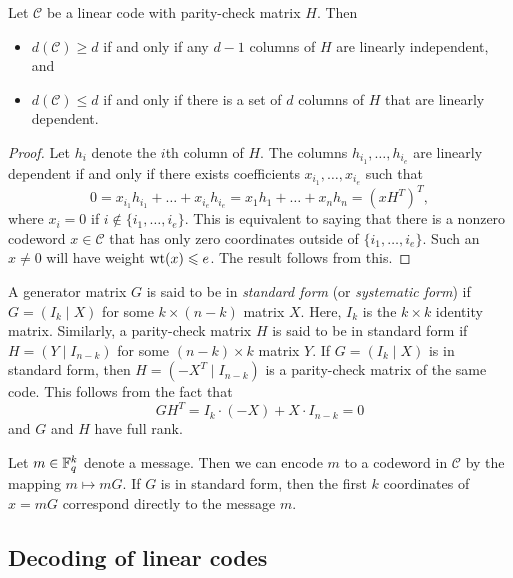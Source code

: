 \documentclass[../main.tex]{subfiles}
\begin{document}
\begin{theorem}\label{thm:minimum_distance_from_check_matrix}
Let $\mathcal{C}$ be a linear code with parity-check matrix $H$. Then
\begin{itemize}
    \item $d(\mathcal{C}) \geq d$ if and only if any $d - 1$ columns of $H$ are linearly independent, and
    \item $d(\mathcal{C}) \leq d$ if and only if there is a set of $d$ columns of $H$ that are linearly dependent.
\end{itemize}
\end{theorem}

\begin{proof}
Let $h_i$ denote the $i$th column of $H$. The columns $h_{i_1}, \dots, h_{i_e}$ are linearly dependent if and only if there exists coefficients $x_{i_1}, \dots, x_{i_e}$ such that
\begin{equation*}
    0 = x_{i_1}h_{i_1} + \dots + x_{i_e}h_{i_e} = x_1 h_1 + \dots + x_n h_n = (xH^T)^T,
\end{equation*}
where $x_i = 0$ if $i \notin \{i_1, \dots, i_e\}$. This is equivalent to saying that there is a nonzero codeword $x \in \mathcal{C}$ that has only zero coordinates outside of $\{i_1, \dots, i_e\}$. Such an $x \neq 0$ will have weight $\operatorname{wt}(x) \leqslant e$. The result follows from this.
\end{proof}

A generator matrix $G$ is said to be in \emph{standard form} (or \emph{systematic form}) if $G = (I_k \mid X)$ for some $k \times (n - k)$ matrix $X$. Here, $I_k$ is the $k \times k$ identity matrix. Similarly, a parity-check matrix $H$ is said to be in standard form if $H = (Y \mid I_{n - k})$ for some $(n - k) \times k$ matrix $Y$. If $G = (I_k \mid X)$ is in standard form, then $H = (-X^T \mid I_{n - k})$ is a parity-check matrix of the same code. This follows from the fact that
\begin{equation*}
    GH^T = I_k \cdot (-X) + X \cdot I_{n-k} = 0
\end{equation*}
and $G$ and $H$ have full rank.

Let $m \in \mathbb{F}_q^k$ denote a message. Then we can encode $m$ to a codeword in $\mathcal{C}$ by the mapping $m \mapsto mG$. If $G$ is in standard form, then the first $k$ coordinates of $x = mG$ correspond directly to the message $m$.

\subsection{Decoding of linear codes}
\end{document}
